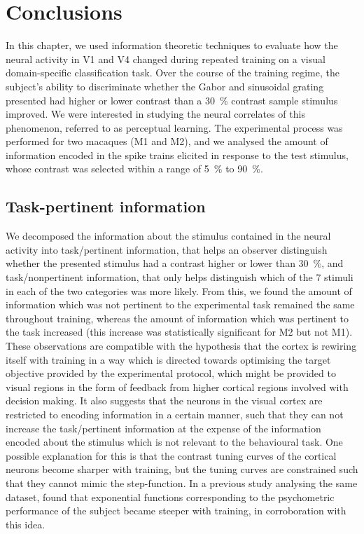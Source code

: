 \section{Conclusions}

In this chapter, we used information theoretic techniques to evaluate how the neural activity in \ac{V1} and \ac{V4} changed during repeated training on a visual domain-specific classification task.
Over the course of the training regime, the subject's ability to discriminate whether the Gabor and sinusoidal grating presented had higher or lower contrast than a \SI{30}{\percent} contrast sample stimulus improved.
We were interested in studying the neural correlates of this phenomenon, referred to as perceptual learning.
The experimental process was performed for two macaques (\ac{M1} and \ac{M2}), and we analysed the amount of information encoded in the spike trains elicited in response to the test stimulus, whose contrast was selected within a range of \SI{5}{\percent} to \SI{90}{\percent}.


\subsection{Task-pertinent information}

We decomposed the information about the stimulus contained in the neural activity into task\-/pertinent information, that helps an observer distinguish whether the presented stimulus had a contrast higher or lower than \SI{30}{\percent}, and task\-/nonpertinent information, that only helps distinguish which of the \num{7} stimuli in each of the two categories was more likely.
From this, we found the amount of information which was not pertinent to the experimental task remained the same throughout training, whereas the amount of information which was pertinent to the task increased (this increase was statistically significant for \ac{M2} but not \ac{M1}).
These observations are compatible with the hypothesis that the cortex is rewiring itself with training in a way which is directed towards optimising the target objective provided by the experimental protocol, which might be provided to visual regions in the form of feedback from higher cortical regions involved with decision making.
It also suggests that the neurons in the visual cortex are restricted to encoding information in a certain manner, such that they can not increase the task\-/pertinent information at the expense of the information encoded about the stimulus which is not relevant to the behavioural task.
One possible explanation for this is that the contrast tuning curves of the cortical neurons become sharper with training, but the tuning curves are constrained such that they cannot mimic the step-function.
In a previous study analysing the same dataset, \citet{Chen2013} found that exponential functions corresponding to the psychometric performance of the subject became steeper with training, in corroboration with this idea.



